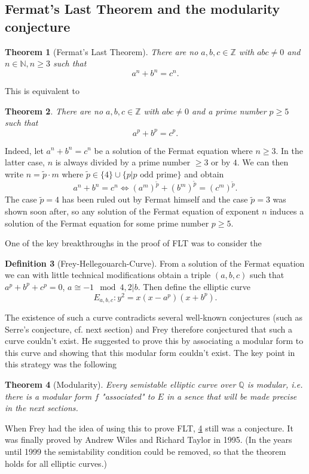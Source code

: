 \documentclass{article}
\theoremstyle{plain}%
\newtheorem{theorem}{Theorem}[section]
\theoremstyle{definition}
\newtheorem{definition}[theorem]{Definition}
\theoremstyle{remark}
\begin{document}
\subsection{Fermat's Last Theorem and the modularity conjecture}
\begin{theorem}[Fermat's Last Theorem]
    There are no \(a, b, c \in \mathbb{Z}\) with \(abc \neq 0\) and \(n \in \mathbb{N}, n \geq 3\) such that
    \[
        a^n + b^n = c^n.  
    \]
\end{theorem}
This is equivalent to
\begin{theorem}
    There are no \(a, b, c \in \mathbb{Z}\) with \(abc \neq 0\) and a prime number \(p \geq 5\) such that
    \[
        a^p + b^p = c^p.  
    \]
\end{theorem}
Indeed, let \(a^n + b^n = c^n\) be a solution of the Fermat equation where \(n \geq 3\).
In the latter case, \(n\) is always divided by a prime number \(\geq 3\) or by \(4\).
We can then write \(n = \tilde{p} \cdot m\) where \(\tilde p \in \{4\} \cup \{p | p \text{ odd prime}\}\)
and obtain 
\[
    a^n + b^n = c^n \Leftrightarrow (a^m)^{\tilde p} + (b^m)^{\tilde p} = (c^m)^{\tilde p}.  
\]
The case \(\tilde p = 4\) has been ruled out by Fermat himself and the case \(\tilde p = 3\)
was shown soon after, so any solution of the Fermat equation of exponent \(n\) 
induces a solution of the Fermat equation for some prime number \(p\geq 5\).

One of the key breakthroughs in the proof of FLT was to consider the
\begin{definition}[Frey-Hellegouarch-Curve]
    From a solution of the Fermat equation we can with little technical modifications obtain a triple \((a,b,c)\) 
    such that \(a^p + b^p + c^p = 0\), \(a \cong -1 \mod 4, 2|b\). Then define the elliptic curve
    \[
        E_{a,b,c}\colon y^2 = x(x-a^p)(x+b^p).
    \]
\end{definition}
The existence of such a curve contradicts several well-known 
conjectures (such as Serre's conjecture, cf. next section) 
and Frey therefore conjectured that such a curve couldn't exist.
He suggested to prove this by associating a modular form to this curve and showing that this modular form couldn't exist.
The key point in this strategy was the following
\begin{theorem}[Modularity]\label{th:modularity}
    Every semistable elliptic curve over \(\mathbb Q\) is modular, i.e. there is a modular form \(f\) "associated" to \(E\)
    in a sence that will be made precise in the next sections.
\end{theorem}
When Frey had the idea of using this to prove FLT, \cref{th:modularity} still was a conjecture.
It was finally proved by Andrew Wiles and Richard Taylor in 1995.
(In the years until 1999 the semistability condition could be removed, so that
the theorem holds for all elliptic curves.)
\end{document}
